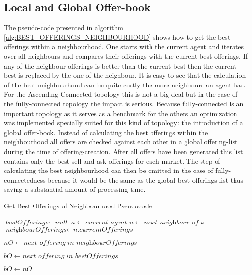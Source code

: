 \documentclass[Bachelorarbeit.tex]{subfiles}
\begin{document}
\subsection{Local and Global Offer-book}
The pseudo-code presented in algorithm \ref{alg:BEST_OFFERINGS_NEIGHBOURHOOD} shows how to get the best offerings within a neighbourhood. One starts with the current agent and iterates over all neighbours and compares their offerings with the current best offerings. If any of the neighbour offerings is better than the current best then the current best is replaced by the one of the neighbour. It is easy to see that the calculation of the best neighbourhood can be quite costly the more neighbours an agent has. For the Ascending-Connected topology this is not a big deal but in the case of the fully-connected topology the impact is serious. Because fully-connected is an important topology as it serves as a benchmark for the others an optimization was implemented specially suited for this kind of topology: the introduction of a global offer-book. Instead of calculating the best offerings within the neighbourhood all offers are checked against each other in a global offering-list during the time of offering-creation. After all offers have been generated this list contains only the best sell and ask offerings for each market. The step of calculating the best neighbourhood can then be omitted in the case of fully-connectedness because it would be the same as the global best-offerings list thus saving a substantial amount of processing time.

\begin{algorithm}
\label{alg:BEST_OFFERINGS_NEIGHBOURHOOD}
\caption{Get Best Offerings of Neighbourhood Pseudocode}\label{euclid}
\begin{algorithmic}[1]
\State $\textit{bestOfferings} \gets \textit{null}$
\State $a \gets \textit{current agent}$
	\State $n \gets \textit{next neighbour of a}$
	\State $\textit{neighbourOfferings} \gets \textit{n.currentOfferings}$
	
		\State $nO \gets \textit{next offering in neighbourOfferings}$
		
			\State $bO \gets \textit{next offering in bestOfferings}$
		
				\State $bO \gets nO$
			\EndIf
		\EndFor
	\EndFor
\EndFor
\end{algorithmic}
\end{algorithm}
\end{document}
